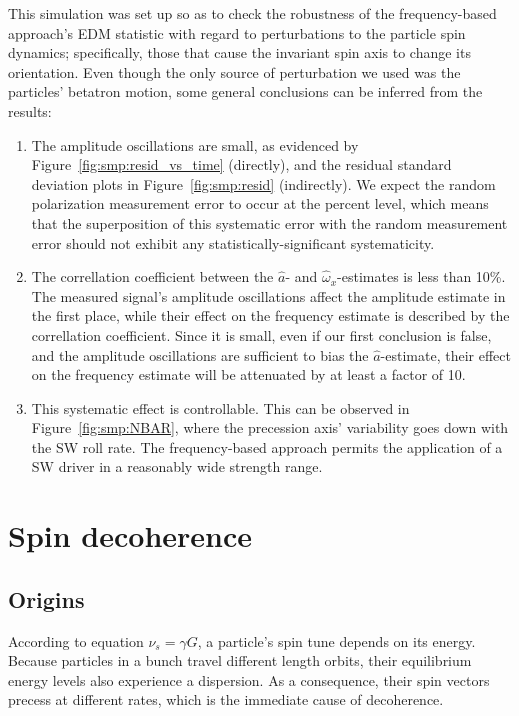 \documentclass[]{elsarticle}
\newcommand{\w}{\omega}
\begin{document}
This simulation was set up so as to check the robustness of the frequency-based approach's EDM statistic
with regard to perturbations to the particle spin dynamics; specifically, those that cause the invariant
spin axis to change its orientation. Even though the only source of perturbation we used was
the particles' betatron motion, some general conclusions can be inferred from the results:
\begin{enumerate}[(1)]
\item The amplitude oscillations are small, as evidenced by Figure~\ref{fig:smp:resid_vs_time} (directly),
  and the residual standard deviation plots in Figure~\ref{fig:smp:resid} (indirectly). We expect the
  random polarization measurement error to occur at the percent level, which means that the superposition
  of this systematic error with the random measurement error should not exhibit any
  statistically-significant systematicity.
\item The correllation coefficient between the $\hat a$- and $\hat\w_x$-estimates is less than 10\%.
  The measured signal's amplitude oscillations affect the amplitude estimate in the first place, while
  their effect on the frequency estimate is described by the correllation coefficient. Since it is small,
  even if our first conclusion is false, and the amplitude oscillations are sufficient to bias the
  $\hat a$-estimate, their effect on the frequency estimate will be attenuated by at least a factor of 10.
\item This systematic effect is controllable. This can be observed in Figure~\ref{fig:smp:NBAR}, where
  the precession axis' variability goes down with the SW roll rate. The frequency-based approach permits
  the application of a SW driver in a reasonably wide strength range.
\end{enumerate}

\section{Spin decoherence}
\subsection{Origins}
According to equation $\nu_s = \gamma G$, a particle's spin tune depends on its energy. Because particles in
a bunch travel different length orbits, their equilibrium energy levels also experience a dispersion. As a
consequence, their spin vectors precess at different rates, which is the immediate cause of decoherence.
\end{document}
